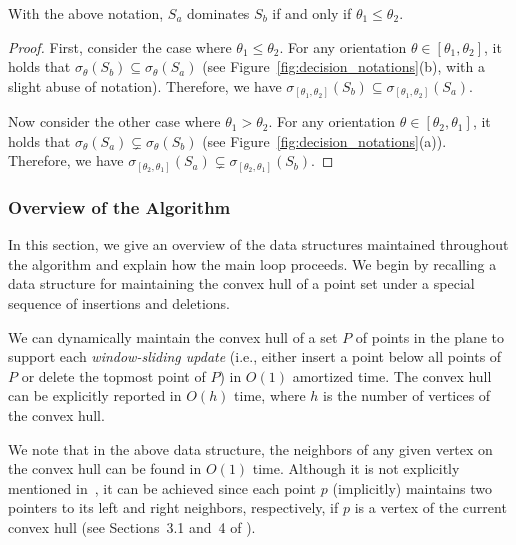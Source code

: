 \begin{observation}
    \label{obs:domination}
    With the above notation, $S_a$ dominates $S_b$ if and only if $\theta_1 \le \theta_2$. 
\end{observation}

\begin{proof}
    First, consider the case where $\theta_1 \le \theta_2$. 
    For any orientation $\theta \in [\theta_1, \theta_2]$, it holds that $\sigma_{\theta}(S_b) \subseteq \sigma_{\theta}(S_a)$ (see Figure~\ref{fig:decision_notations}(b), with a slight abuse of notation).
    Therefore, we have $\sigma_{[\theta_1, \theta_2]}(S_b) \subseteq \sigma_{[\theta_1, \theta_2]}(S_a)$.

    Now consider the other case where $\theta_1 > \theta_2$.
    For any orientation $\theta \in [\theta_2, \theta_1]$, it holds that $\sigma_{\theta}(S_a) \subsetneq \sigma_{\theta}(S_b)$ (see Figure~\ref{fig:decision_notations}(a)). 
    Therefore, we have $\sigma_{[\theta_2, \theta_1]}(S_a) \subsetneq \sigma_{[\theta_2, \theta_1]}(S_b)$.
\end{proof}



\subsubsection{Overview of the Algorithm}
\label{sec:decision_overview}

In this section, we give an overview of the data structures maintained throughout the algorithm and explain how the main loop proceeds. 
We begin by recalling a data structure for maintaining the convex hull of a point set under a special sequence of insertions and deletions.


\begin{lemma}
\label{lem:dyn_conv}
    We can dynamically maintain the convex hull of a set $P$ of points in the plane to support each \emph{window-sliding update} (i.e., either insert a point below all points of $P$ or delete the topmost point of $P$) in $O(1)$ amortized time. 
    The convex hull can be explicitly reported in $O(h)$ time, where $h$ is the number of vertices of the convex hull. 
\end{lemma}

We note that in the above data structure, the neighbors of any given vertex on the convex hull can be found in $O(1)$ time. 
Although it is not explicitly mentioned in~\cite{wang2023dynamic}, it can be achieved since each point $p$ (implicitly) maintains two pointers to its left and right neighbors, respectively, if $p$ is a vertex of the current convex hull (see Sections~3.1 and~4 of \cite{wang2023dynamic}).



